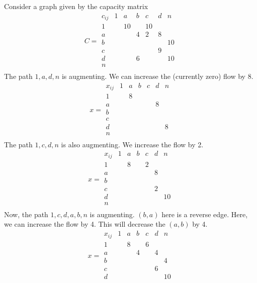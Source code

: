 \begin{example}
    Consider a graph given by the capacity matrix
    \[ C = \begin{array}{c|cccccc}
        c_{ij} & 1 & a & b & c & d & n \\\hline
        1 & & 10 & & 10 & & \\
        a & & & 4 & 2 & 8 & \\
        b & & & & & & 10 \\
        c & & & & & 9 & \\
        d & & & 6 & & & 10 \\
        n \\
\end{array} \]
The path \( 1,a,d,n \) is augmenting.
We can increase the (currently zero) flow by 8.
\[ x = \begin{array}{c|cccccc}
    x_{ij} & 1 & a & b & c & d & n \\\hline
    1 & & 8 & & & & \\
    a & & & & & 8 & \\
    b & & & & & & \\
    c & & & & & & \\
    d & & & & & & 8 \\
    n \\
\end{array} \]
The path \( 1,c,d,n \) is also augmenting.
We increase the flow by 2.
\[ x = \begin{array}{c|cccccc}
    x_{ij} & 1 & a & b & c & d & n \\\hline
    1 & & 8 & & 2 & & \\
    a & & & & & 8 & \\
    b & & & & & & \\
    c & & & & & 2 & \\
    d & & & & & & 10 \\
    n \\
\end{array} \]
Now, the path \( 1,c,d,a,b,n \) is augmenting. \( (b,a) \) here is a reverse edge.
Here, we can increase the flow by 4. This will decrease the \( (a,b) \) by 4.
\[ x = \begin{array}{c|cccccc}
    x_{ij} & 1 & a & b & c & d & n \\\hline
    1 & & 8 & & 6 & & \\
    a & & & 4 & & 4 & \\
    b & & & & & & 4 \\
    c & & & & & 6 & \\
    d & & & & & & 10 \\

\end{array}\]
\end{example}
